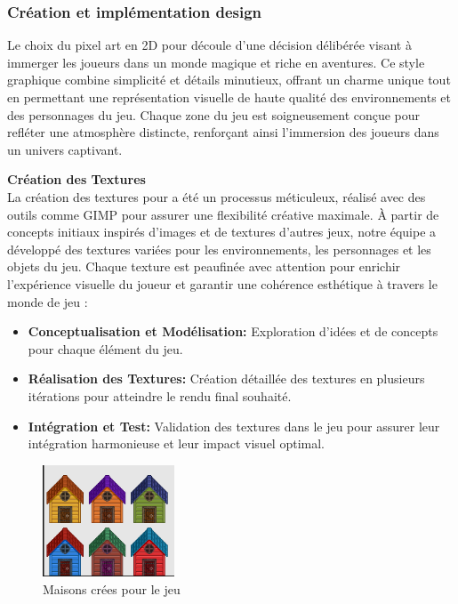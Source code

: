 \subsubsection{Création et implémentation design}





Le choix du pixel art en 2D pour \gameName découle d'une décision délibérée visant à immerger les joueurs dans un monde magique et riche en aventures.
Ce style graphique combine simplicité et détails minutieux, offrant un charme unique tout en permettant une représentation visuelle de haute qualité des environnements et 
des personnages du jeu.
Chaque zone du jeu est soigneusement conçue pour refléter une atmosphère distincte, renforçant ainsi l'immersion des joueurs dans un univers captivant.

\textbf{Création des Textures}
\\

La création des textures pour \gameName a été un processus méticuleux, réalisé avec des outils comme GIMP pour assurer une flexibilité créative maximale.
À partir de concepts initiaux inspirés d'images et de textures d'autres jeux, notre équipe a développé des textures variées pour les environnements, les personnages
 et les objets du jeu.
Chaque texture est peaufinée avec attention pour enrichir l'expérience visuelle du joueur et garantir une cohérence esthétique à travers le monde de jeu :
\\

\begin{itemize}

      \item \textbf{Conceptualisation et Modélisation:} Exploration d'idées et de concepts pour chaque élément du jeu.
            \\

      \item \textbf{Réalisation des Textures:} Création détaillée des textures en plusieurs itérations pour atteindre le rendu final souhaité.
            \\

      \item \textbf{Intégration et Test:} Validation des textures dans le jeu pour assurer leur intégration harmonieuse et leur impact visuel optimal.
            \\

\end{itemize}

\begin{figure}[H]
      \centering
      \includegraphics[width=0.35\textwidth]{assets/maison.png}
      \caption{Maisons crées pour le jeu}
      \label{fig:maison}
\end{figure}

